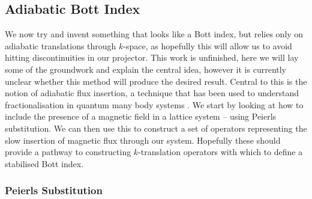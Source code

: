 \subsection{Adiabatic Bott Index}

We now try and invent something that looks like a Bott index, but relies only on adiabatic translations through $k$-space, as hopefully this will allow us to avoid hitting discontinuities in our projector. This work is unfinished, here we will lay some of the groundwork and explain the central idea, however it is currently unclear whether this method will produce the desired result. Central to this is the notion of adiabatic flux insertion, a technique that has been used to understand fractionalisation in quantum many body systems \cite{oshikawa_fractionalization_2006}. We start by looking at how to include the presence of a magnetic field in a lattice system -- using Peierls substitution. We can then use this to construct a set of operators representing the slow insertion of magnetic flux through our system. Hopefully these should provide a pathway to constructing $k$-translation operators with which to define a stabilised Bott index.

\subsubsection{Peierls Substitution}

